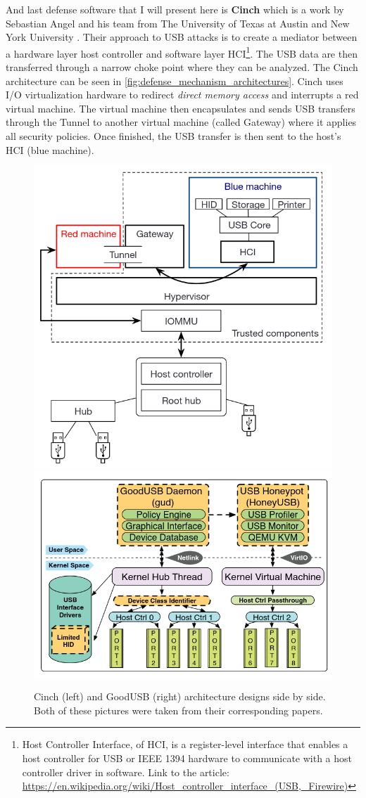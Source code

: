 And last defense software that I will present here is \textbf{Cinch} which is a work by Sebastian Angel and his team from The University of Texas at Austin and New York University \cite{197175}. Their approach to USB attacks is to create a mediator between a hardware layer host controller and software layer HCI\footnote{Host Controller Interface, of HCI, is a register-level interface that enables a host controller for USB or IEEE 1394 hardware to communicate with a host controller driver in software. Link to the article: \url{https://en.wikipedia.org/wiki/Host_controller_interface_(USB,_Firewire)}}. The USB data are then transferred through a narrow choke point where they can be analyzed. The Cinch architecture can be seen in \autoref{fig:defense_mechanism_architectures}. Cinch uses I/O virtualization hardware to redirect \emph{direct memory access} and interrupts a red virtual machine. The virtual machine then encapsulates and sends USB transfers through the Tunnel to another virtual machine (called Gateway) where it applies all security policies. Once finished, the USB transfer is then sent to the host's HCI (blue machine).
\begin{figure}[ht]
    \centering
    \includegraphics[width=0.4\linewidth]{./obrazky-figures/cinch_arch.png}
    \includegraphics[width=0.4\linewidth]{./obrazky-figures/goodusb_arch.png}
    \caption{Cinch (left)\cite{197175} and GoodUSB (right)\cite{goodusb} architecture designs side by side. Both of these pictures were taken from their corresponding papers.}
    \label{fig:defense_mechanism_architectures}
\end{figure}

